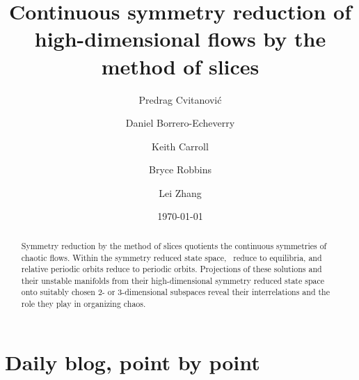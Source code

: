 \documentclass[twocolumn,
secnumarabic,
nofootinbib, tightenlines,
nobibnotes, showkeys, aps,
cha]{revtex4-1}
\begin{document}
\title[Symmetry reduction by the method of slices]
{Continuous symmetry reduction of high-dimensional flows
 by the method of slices}


\author{Predrag Cvitanovi{\'c}}
\author{Daniel Borrero-Echeverry}
\author{Keith Carroll}
\author{Bryce Robbins}
\author{Lei Zhang}

\date{\today}

\begin{abstract}
Symmetry reduction by the method of slices
quotients the continuous symmetries of chaotic flows. Within the
symmetry reduced state space, \reqva\ reduce to
equilibria, and relative periodic orbits reduce to periodic orbits.
Projections of these solutions and their unstable manifolds from their
high-dimensional symmetry reduced state space onto suitably chosen 2-
or 3-dimensional subspaces reveal their interrelations and the role they
play in organizing chaos.

\end{abstract}


\maketitle








% 


\ifdraft
    \onecolumngrid

    \newpage

    \newpage

    \newpage
    \section{Daily blog, point by point}
    \label{chap:atlas}

\fi
\end{document}
